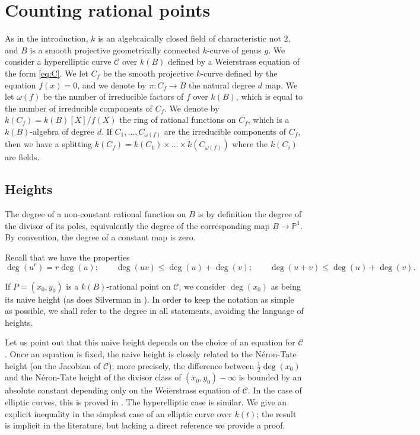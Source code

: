 \documentclass[11pt]{article}
\theoremstyle{plain}
\theoremstyle{definition}
\newcommand{\PP}{\mathbb{P}}
\begin{document}

\section{Counting rational points}
\label{section2}

As in the introduction, $k$ is an algebraically closed field of characteristic not $2$, and $B$ is a smooth projective geometrically connected $k$-curve of genus $g$. We consider a hyperelliptic curve $\mathcal{C}$ over $k(B)$ defined by a Weierstrass equation of the form \eqref{eq:C}.
We let $C_f$ be the smooth projective $k$-curve defined by the equation $f(x)=0$, and we denote by $\pi:C_f\to B$ the natural degree $d$ map. We let $\omega(f)$ be the number of irreducible factors of $f$ over $k(B)$, which is equal to the number of irreducible components of $C_f$. We denote by $k(C_f) = k(B)[X]/f(X)$ the ring of rational functions on $C_f$, which is a $k(B)$-algebra of degree $d$. If $C_1,\dots,C_{\omega(f)}$ are the irreducible components of $C_f$, then we have a splitting $k(C_f) = k(C_1)\times\dots \times k(C_{\omega(f)})$ where the $k(C_i)$ are fields.



\subsection{Heights}
\label{sec:heights}

The degree of a non-constant rational function on $B$ is by definition the degree of the divisor of its poles, equivalently the degree of the corresponding map $B\to \PP^1$. By convention, the degree of a constant map is zero.

Recall that we have the properties
$$
\deg(u^r)=r\deg(u); \qquad \deg(uv) \leq \deg(u) + \deg(v); \qquad \deg(u+v) \leq \deg(u) + \deg(v).
$$

If $P=(x_0,y_0)$ is a $k(B)$-rational point on $\mathcal{C}$, we consider $\deg(x_0)$ as being its naive height (as does Silverman in \cite[Chap.~III, \S{}4]{silvermanII}). In order to keep the notation as simple as possible, we shall refer to the degree in all statements, avoiding the language of heights.

Let us point out that this naive height depends on the choice of an equation for $\mathcal{C}$. Once an equation is fixed, the naive height is closely related to the N{\'e}ron-Tate height (on the Jacobian of $\mathcal{C}$); more precisely, the difference between $\frac{1}{2}\deg(x_0)$ and the N{\'e}ron-Tate height of the divisor class of $(x_0,y_0)-\infty$ is bounded by an absolute constant depending only on the Weierstrass equation of $\mathcal{C}$. In the case of elliptic curves, this is proved in \cite[Chap.~III, \S{}4]{silvermanII}. The hyperelliptic case is similar.
We give an explicit inequality in the simplest case of an elliptic curve over $k(t)$; the result is implicit in the literature, but lacking a direct reference we provide a proof.
\end{document}
